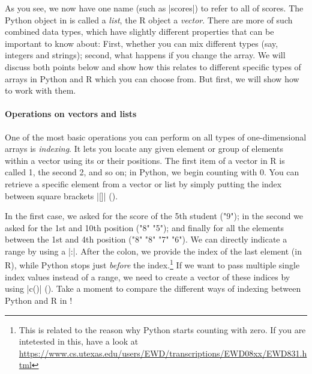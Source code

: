 



As you see, we now have one name (such as |scores|) to refer to all of scores.
The Python object in  is called a \emph{list}, the R object a \emph{vector}.
There are more of such combined data types, which have slightly different
properties that can be important to know about: First, whether you can mix different
types (say, integers and strings); second, what happens if you change the array.
We will discuss both points below and show how this relates to different
specific types of arrays in Python and R which you can choose from. But first,
we will show how to work with them.


\paragraph{Operations on vectors and lists}
One of the most
basic operations you can perform on all types of one-dimensional arrays
is \emph{indexing}. It lets you locate any given
element or group of elements within a vector using its or their
positions. The first item of a vector in R is called 1, the second 2, and so on;
in Python, we begin counting with 0.  You can retrieve a specific element
from a vector or list by simply putting the index between square brackets |[]| (). %


In the first case, we asked for the score of the 5th student ("9");
in the second we asked for the 1st and 10th position ("8" "5"); and
finally for all the elements between the 1st and 4th position ("8"
"8" "7" "6"). We can directly indicate a range
by using a |:|. After the colon, we provide the index of
the last element (in R), while Python stops just \emph{before} the index.\footnote{This is related to the
reason why Python starts counting with zero. If you are intetested
in this, have a look at \url{https://www.cs.utexas.edu/users/EWD/transcriptions/EWD08xx/EWD831.html}}
If we want to pass multiple single index values instead of a range,
we need to create a vector of these indices by using |c()| ().
Take a moment to compare the different ways of indexing between Python
and R in !

